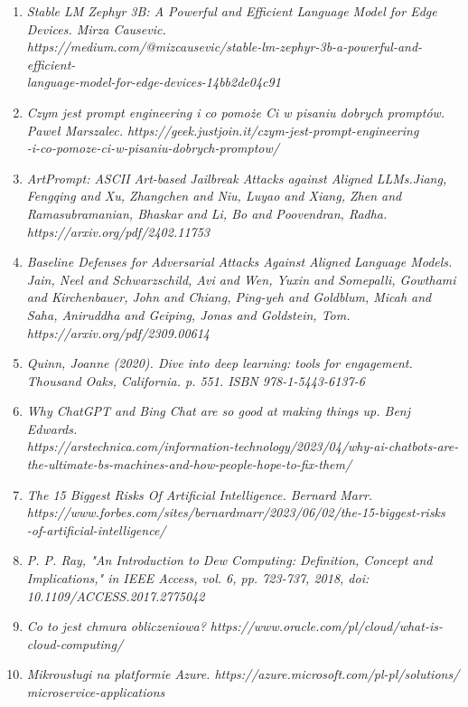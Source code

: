 \begin{enumerate}
\item {\textit {Stable LM Zephyr 3B: A Powerful and Efficient Language Model for Edge Devices. Mirza Causevic. \\ https://medium.com/@mizcausevic/stable-lm-zephyr-3b-a-powerful-and-efficient-\\language-model-for-edge-devices-14bb2de04c91}}
\item {\textit {Czym jest prompt engineering i co pomoże Ci w pisaniu dobrych promptów. Paweł Marszalec. https://geek.justjoin.it/czym-jest-prompt-engineering\\-i-co-pomoze-ci-w-pisaniu-dobrych-promptow/}}
\item {\textit {ArtPrompt: ASCII Art-based Jailbreak Attacks against Aligned LLMs.Jiang, Fengqing and Xu, Zhangchen and Niu, Luyao and Xiang, Zhen and Ramasubramanian, Bhaskar and Li, Bo and Poovendran, Radha. \\ https://arxiv.org/pdf/2402.11753 }}
\item {\textit {Baseline Defenses for Adversarial Attacks Against Aligned Language Models. Jain, Neel and Schwarzschild, Avi and Wen, Yuxin and Somepalli, Gowthami and Kirchenbauer, John and Chiang, Ping-yeh and Goldblum, Micah and Saha, Aniruddha and Geiping, Jonas and Goldstein, Tom. https://arxiv.org/pdf/2309.00614}}
\item {\textit {Quinn, Joanne (2020). Dive into deep learning: tools for engagement. Thousand Oaks, California. p. 551. ISBN 978-1-5443-6137-6}}
\item {\textit {Why ChatGPT and Bing Chat are so good at making things up. Benj Edwards. \\ https://arstechnica.com/information-technology/2023/04/why-ai-chatbots-are-\\the-ultimate-bs-machines-and-how-people-hope-to-fix-them/}}
\item {\textit {The 15 Biggest Risks Of Artificial Intelligence. Bernard Marr. \\ https://www.forbes.com/sites/bernardmarr/2023/06/02/the-15-biggest-risks\\-of-artificial-intelligence/}}
\item {\textit {P. P. Ray, "An Introduction to Dew Computing: Definition, Concept and Implications," in IEEE Access, vol. 6, pp. 723-737, 2018, doi: 10.1109/ACCESS.2017.2775042}}
\item {\textit {Co to jest chmura obliczeniowa? https://www.oracle.com/pl/cloud/what-is-cloud-computing/}}
\item {\textit {Mikrousługi na platformie Azure. https://azure.microsoft.com/pl-pl/solutions/\\microservice-applications}}

\end{enumerate}

